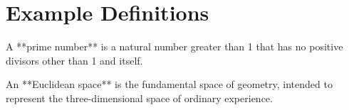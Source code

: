 \documentclass{article}
\begin{document}
\section*{Example Definitions}

\begin{definition}
  A **prime number** is a natural number greater than 1 that has no positive divisors other than 1 and itself.
\end{definition}

\begin{definition}
  An **Euclidean space** is the fundamental space of geometry, intended to represent the three-dimensional space of ordinary experience.
\end{definition}
\end{document}

